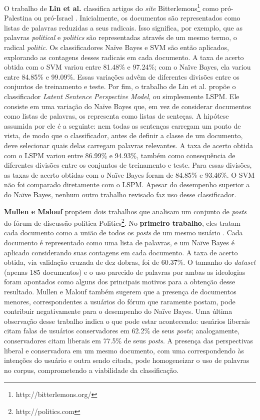 O trabalho de \textbf{Lin et al.} classifica artigos do \emph{site} Bitterlemons\footnote{http://bitterlemons.org/} como pró-Palestina ou pró-Israel \cite{lin-et-al2006}. Inicialmente, os documentos são representados como listas de palavras reduzidas a seus radicais. Isso significa, por exemplo, que as palavras \emph{political} e \emph{politics} são representadas através de um mesmo termo, o radical \emph{politic}. Os classificadores Naïve Bayes e SVM são então aplicados, explorando as contagens desses radicais em cada documento. A taxa de acerto obtida com o SVM variou entre 81.48\% e 97.24\%; com o Naïve Bayes, ela variou entre 84.85\% e 99.09\%. Essas variações advêm de diferentes divisões entre os conjuntos de treinamento e teste. Por fim, o trabalho de Lin et al. propõe o classificador \emph{Latent Sentence Perspective Model}, ou simplesmente LSPM. Ele consiste em uma variação do Naïve Bayes que, em vez de considerar documentos como listas de palavras, os representa como listas de senteças. A hipótese assumida por ele é a seguinte: nem todas as sentenças carregam um ponto de vista, de modo que o classificador, antes de definir a classe de um documento, deve selecionar quais delas carregam palavras relevantes. A taxa de acerto obtida com o LSPM variou entre  86.99\% e 94.93\%, também como consequência de diferentes divisões entre os conjuntos de treinamento e teste. Para essas divisões, as taxas de acerto obtidas com o Naïve Bayes foram de 84.85\% e 93.46\%. O SVM não foi comparado diretamente com o LSPM. Apesar do desempenho superior a do Naïve Bayes, nenhum outro trabalho revisado faz uso desse classificador. 

\textbf{Mullen e Malouf} propõem dois trabalhos que analisam um conjunto de \emph{posts} do fórum de discussão política Politics\footnote{http://politics.com}. No \textbf{primeiro trabalho}, eles tratam cada documento como a união de todos os \emph{posts} de um mesmo usuário \cite{aaai-politics}. Cada documento é representado como uma lista de palavras, e um Naïve Bayes é aplicado considerando suas contagens em cada documento. A taxa de acerto obtida, via validação cruzada de dez dobras, foi de 60.37\%. O tamanho do \emph{dataset} (apenas 185 documentos) e o uso parecido de palavras por ambas as ideologias foram apontados como alguns dos principais motivos para a obtenção desse resultado. Mullen e Malouf também sugerem que a presença de documentos menores, correspondentes a usuários do fórum que raramente postam, pode contribuir negativamente para o desempenho do Naïve Bayes. Uma última observação desse trabalho indica o que pode estar acontecendo: usuários liberais citam falas de usuários conservadores em 62.2\% de seus \emph{posts}; analogamente, conservadores citam liberais em 77.5\%  de seus \emph{posts}. A presença das perspectivas liberal e conservadora em um mesmo documento, com uma correspondendo às intenções do usuário e outra sendo citada, pode homogeneizar o uso de palavras no corpus, comprometendo a viabilidade da classificação.

